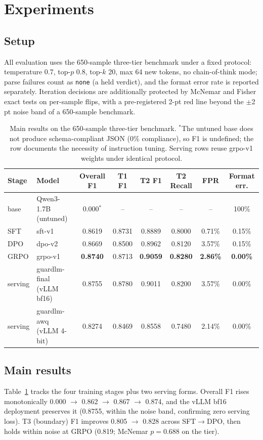 \documentclass[11pt]{article}
\begin{document}
\section{Experiments}
\label{sec:exp}

\subsection{Setup}
All evaluation uses the 650-sample three-tier benchmark under a fixed protocol: temperature 0.7, top-$p$ 0.8, top-$k$ 20, max 64 new tokens, no chain-of-think mode; parse failures count as \texttt{none} (a held verdict), and the format error rate is reported separately. Iteration decisions are additionally protected by McNemar and Fisher exact tests on per-sample flips, with a pre-registered 2-pt red line beyond the $\pm$2\,pt noise band of a 650-sample benchmark.

\begin{table}[t]
\centering\small
\begin{tabular}{llcccccc}
\toprule
Stage & Model & Overall F1 & T1 F1 & T2 F1 & T2 Recall & FPR & Format err. \\
\midrule
base & Qwen3-1.7B (untuned) & 0.000$^{*}$ & -- & -- & -- & -- & 100\% \\
SFT & sft-v1 & 0.8619 & 0.8731 & 0.8889 & 0.8000 & 0.71\% & 0.15\% \\
DPO & dpo-v2 & 0.8669 & 0.8500 & 0.8962 & 0.8120 & 3.57\% & 0.15\% \\
GRPO & grpo-v1 & \textbf{0.8740} & 0.8713 & \textbf{0.9059} & \textbf{0.8280} & \textbf{2.86\%} & \textbf{0.00\%} \\
\midrule
serving & guardlm-final (vLLM bf16) & 0.8755 & 0.8780 & 0.9011 & 0.8200 & 3.57\% & 0.00\% \\
serving & guardlm-awq (vLLM 4-bit) & 0.8274 & 0.8469 & 0.8558 & 0.7480 & 2.14\% & 0.00\% \\
\bottomrule
\end{tabular}
\caption{Main results on the 650-sample three-tier benchmark. $^{*}$The untuned base does not produce schema-compliant JSON (0\% compliance), so F1 is undefined; the row documents the necessity of instruction tuning. Serving rows reuse grpo-v1 weights under identical protocol.}
\label{tab:main}
\end{table}

\subsection{Main results}
Table~\ref{tab:main} tracks the four training stages plus two serving forms. Overall F1 rises monotonically 0.000 $\rightarrow$ 0.862 $\rightarrow$ 0.867 $\rightarrow$ 0.874, and the vLLM bf16 deployment preserves it (0.8755, within the noise band, confirming zero serving loss). T3 (boundary) F1 improves 0.805 $\rightarrow$ 0.828 across SFT$\rightarrow$DPO, then holds within noise at GRPO (0.819; McNemar $p=0.688$ on the tier).
\end{document}

